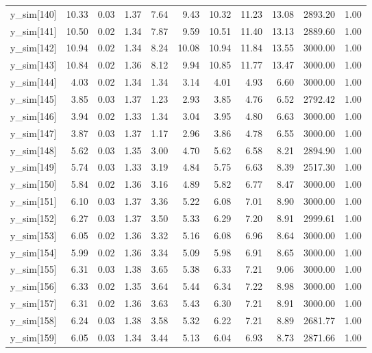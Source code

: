 \begin{table}[ht]
\begin{tabular}{rrrrrrrrrrr}
  y\_sim[140] & 10.33 & 0.03 & 1.37 & 7.64 & 9.43 & 10.32 & 11.23 & 13.08 & 2893.20 & 1.00 \\ 
  y\_sim[141] & 10.50 & 0.02 & 1.34 & 7.87 & 9.59 & 10.51 & 11.40 & 13.13 & 2889.60 & 1.00 \\ 
  y\_sim[142] & 10.94 & 0.02 & 1.34 & 8.24 & 10.08 & 10.94 & 11.84 & 13.55 & 3000.00 & 1.00 \\ 
  y\_sim[143] & 10.84 & 0.02 & 1.36 & 8.12 & 9.94 & 10.85 & 11.77 & 13.47 & 3000.00 & 1.00 \\ 
  y\_sim[144] & 4.03 & 0.02 & 1.34 & 1.34 & 3.14 & 4.01 & 4.93 & 6.60 & 3000.00 & 1.00 \\ 
  y\_sim[145] & 3.85 & 0.03 & 1.37 & 1.23 & 2.93 & 3.85 & 4.76 & 6.52 & 2792.42 & 1.00 \\ 
  y\_sim[146] & 3.94 & 0.02 & 1.33 & 1.34 & 3.04 & 3.95 & 4.80 & 6.63 & 3000.00 & 1.00 \\ 
  y\_sim[147] & 3.87 & 0.03 & 1.37 & 1.17 & 2.96 & 3.86 & 4.78 & 6.55 & 3000.00 & 1.00 \\ 
  y\_sim[148] & 5.62 & 0.03 & 1.35 & 3.00 & 4.70 & 5.62 & 6.58 & 8.21 & 2894.90 & 1.00 \\ 
  y\_sim[149] & 5.74 & 0.03 & 1.33 & 3.19 & 4.84 & 5.75 & 6.63 & 8.39 & 2517.30 & 1.00 \\ 
  y\_sim[150] & 5.84 & 0.02 & 1.36 & 3.16 & 4.89 & 5.82 & 6.77 & 8.47 & 3000.00 & 1.00 \\ 
  y\_sim[151] & 6.10 & 0.03 & 1.37 & 3.36 & 5.22 & 6.08 & 7.01 & 8.90 & 3000.00 & 1.00 \\ 
  y\_sim[152] & 6.27 & 0.03 & 1.37 & 3.50 & 5.33 & 6.29 & 7.20 & 8.91 & 2999.61 & 1.00 \\ 
  y\_sim[153] & 6.05 & 0.02 & 1.36 & 3.32 & 5.16 & 6.08 & 6.96 & 8.64 & 3000.00 & 1.00 \\ 
  y\_sim[154] & 5.99 & 0.02 & 1.36 & 3.34 & 5.09 & 5.98 & 6.91 & 8.65 & 3000.00 & 1.00 \\ 
  y\_sim[155] & 6.31 & 0.03 & 1.38 & 3.65 & 5.38 & 6.33 & 7.21 & 9.06 & 3000.00 & 1.00 \\ 
  y\_sim[156] & 6.33 & 0.02 & 1.35 & 3.64 & 5.44 & 6.34 & 7.22 & 8.98 & 3000.00 & 1.00 \\ 
  y\_sim[157] & 6.31 & 0.02 & 1.36 & 3.63 & 5.43 & 6.30 & 7.21 & 8.91 & 3000.00 & 1.00 \\ 
  y\_sim[158] & 6.24 & 0.03 & 1.38 & 3.58 & 5.32 & 6.22 & 7.21 & 8.89 & 2681.77 & 1.00 \\ 
  y\_sim[159] & 6.05 & 0.03 & 1.34 & 3.44 & 5.13 & 6.04 & 6.93 & 8.73 & 2871.66 & 1.00 \\ 

\end{tabular}
\end{table}

